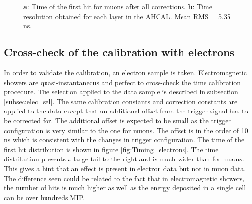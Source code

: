 \documentclass[twoside,a4paper,11pt]{article}
\begin{document}
\begin{figure}[htbp]
	\hfill
	\caption[]{\textbf{a}: Time of the first hit for muons after all corrections. \textbf{b}: Time resolution obtained for each layer in the AHCAL. Mean RMS = 5.35 ns.}
\end{figure}

\subsection{Cross-check of the calibration with electrons}
\label{subsec:validation}

In order to validate the calibration, an electron sample is taken. Electromagnetic showers are quasi-instantaneous and perfect to cross-check the time calibration procedure. The selection applied to the data sample is described in subsection \ref{subsec:elec_sel}. The same calibration constants and correction constants are applied to the data except that an additional offset from the trigger signal has to be corrected for. The additional offset is expected to be small as the trigger configuration is very similar to the one for muons. The offset is in the order of 10 ns which is consistent with the changes in trigger configuration. The time of the first hit distribution is shown in figure \ref{fig:Timing_electrons}. The time distribution presents a large tail to the right and is much wider than for muons. This gives a hint that an effect is present in electron data but not in muon data. The difference seen could be related to the fact that in electromagnetic showers, the number of hits is much higher as well as the energy deposited in a single cell can be over hundreds MIP.
\end{document}
